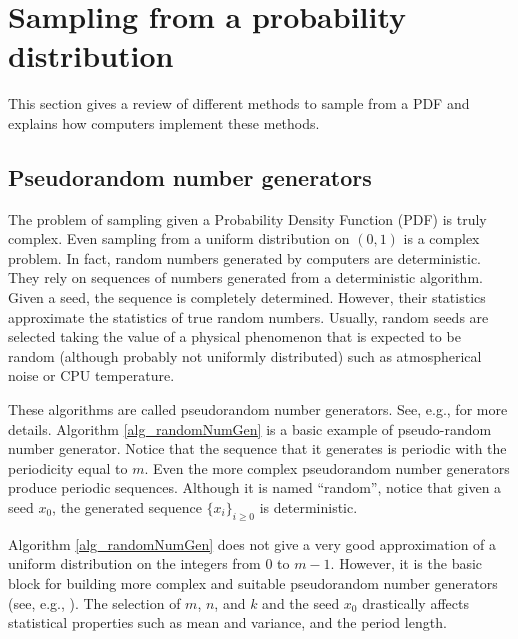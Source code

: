 \section{Sampling from a probability distribution} \label{sec_sampling}

This section gives a review of different methods to sample from a PDF and explains how computers implement these methods.

\subsection{Pseudorandom number generators} \label{sec_pseudorandomNumberGenerator}

The problem of sampling given a Probability Density Function (PDF) is truly complex. Even sampling from a uniform distribution on $(0,1)$ is a complex problem. In fact, random numbers generated by computers are deterministic. They rely on sequences of numbers generated from a deterministic algorithm. 
Given a seed, the sequence is completely determined.
However, their statistics approximate the statistics of true random numbers. 
Usually, random seeds are selected taking the value of a physical phenomenon that is expected to be random (although probably not uniformly distributed) such as atmospherical noise or CPU temperature.

These algorithms are called pseudorandom number generators. See, e.g., \textcite{knuth1969} for more details. Algorithm \ref{alg_randomNumGen} is a basic example of pseudo-random number generator. Notice that the sequence that it generates is periodic with the periodicity equal to $m$. Even the more complex pseudorandom number generators produce periodic sequences. Although it is named ``random'', notice that given a seed $x_0$, the generated sequence $\{ x_i \}_{i \geq 0}$ is deterministic. 

Algorithm \ref{alg_randomNumGen} does not give a very good approximation of a uniform distribution on the integers from $0$ to $m-1$. However, it is the basic block for building more complex and suitable pseudorandom number generators (see, e.g., \textcite{krauth2006}). The selection of $m$, $n$, and $k$ and the seed $x_0$ drastically affects statistical properties such as mean and variance, and the period length.

